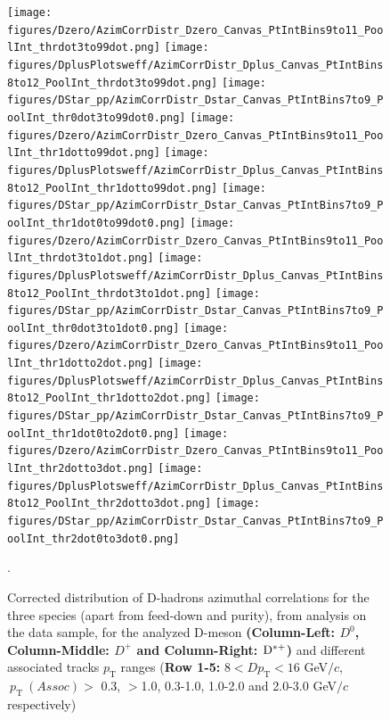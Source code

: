 \begin{figure}[hp]
\centering
{\texttt{[image: figures/Dzero/AzimCorrDistr\_Dzero\_Canvas\_PtIntBins9to11\_PoolInt\_thrdot3to99dot.png]}}
{\texttt{[image: figures/DplusPlotsweff/AzimCorrDistr\_Dplus\_Canvas\_PtIntBins8to12\_PoolInt\_thrdot3to99dot.png]}}
{\texttt{[image: figures/DStar\_pp/AzimCorrDistr\_Dstar\_Canvas\_PtIntBins7to9\_PoolInt\_thr0dot3to99dot0.png]}}
{\texttt{[image: figures/Dzero/AzimCorrDistr\_Dzero\_Canvas\_PtIntBins9to11\_PoolInt\_thr1dotto99dot.png]}}
{\texttt{[image: figures/DplusPlotsweff/AzimCorrDistr\_Dplus\_Canvas\_PtIntBins8to12\_PoolInt\_thr1dotto99dot.png]}}
{\texttt{[image: figures/DStar\_pp/AzimCorrDistr\_Dstar\_Canvas\_PtIntBins7to9\_PoolInt\_thr1dot0to99dot0.png]}}
{\texttt{[image: figures/Dzero/AzimCorrDistr\_Dzero\_Canvas\_PtIntBins9to11\_PoolInt\_thrdot3to1dot.png]}}
{\texttt{[image: figures/DplusPlotsweff/AzimCorrDistr\_Dplus\_Canvas\_PtIntBins8to12\_PoolInt\_thrdot3to1dot.png]}}
{\texttt{[image: figures/DStar\_pp/AzimCorrDistr\_Dstar\_Canvas\_PtIntBins7to9\_PoolInt\_thr0dot3to1dot0.png]}}
{\texttt{[image: figures/Dzero/AzimCorrDistr\_Dzero\_Canvas\_PtIntBins9to11\_PoolInt\_thr1dotto2dot.png]}}
{\texttt{[image: figures/DplusPlotsweff/AzimCorrDistr\_Dplus\_Canvas\_PtIntBins8to12\_PoolInt\_thr1dotto2dot.png]}}
{\texttt{[image: figures/DStar\_pp/AzimCorrDistr\_Dstar\_Canvas\_PtIntBins7to9\_PoolInt\_thr1dot0to2dot0.png]}}
{\texttt{[image: figures/Dzero/AzimCorrDistr\_Dzero\_Canvas\_PtIntBins9to11\_PoolInt\_thr2dotto3dot.png]}}
{\texttt{[image: figures/DplusPlotsweff/AzimCorrDistr\_Dplus\_Canvas\_PtIntBins8to12\_PoolInt\_thr2dotto3dot.png]}}
{\texttt{[image: figures/DStar\_pp/AzimCorrDistr\_Dstar\_Canvas\_PtIntBins7to9\_PoolInt\_thr2dot0to3dot0.png]}}
\caption{Corrected distribution of D-hadrons azimuthal correlations for the three species (apart from feed-down and purity), from analysis on the data sample, for the analyzed D-meson \textbf{(Column-Left: $D^0$, Column-Middle: $D^+$ and Column-Right: ${\rm D^{*+}}$)} and different associated tracks $p_\text{T}$ ranges (\textbf{Row 1-5:} $8 < D p_\text{T} < 16$ GeV$/c$, $ \ p_\text{T}~(Assoc)>$ 0.3, $>$1.0, 0.3-1.0, 1.0-2.0 and 2.0-3.0 GeV$/c$ respectively)}.
\label{fig:DataD0DpDs3}
\end{figure}

\clearpage
\newpage

